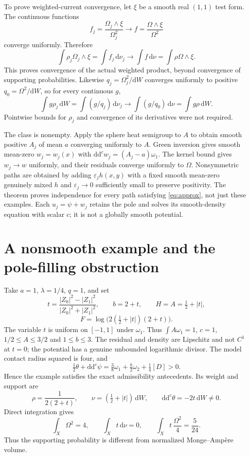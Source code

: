 \documentclass[11pt]{article}
\newcommand{\ddc}{\mathrm{d}\mathrm{d}^c}
\begin{document}
To prove weighted-current convergence, let $\xi$ be a smooth real
$(1,1)$ test form. The continuous functions
\[
 f_j=\frac{\Omega_j\wedge\xi}{\Omega_j^2}
 \longrightarrow f=\frac{\Omega\wedge\xi}{\Omega^2}
\]
converge uniformly. Therefore
\[
 \int\rho_j\Omega_j\wedge\xi
 =\int f_j\,\mathrm{d}\nu_j\longrightarrow
 \int f\,\mathrm{d}\nu=\int\rho\Omega\wedge\xi.
\]
This proves convergence of the actual weighted product, beyond convergence
of supporting probabilities. Likewise $q_j=\Omega_j^2/\mathrm{d}W$
converges uniformly to positive $q_0=\Omega^2/\mathrm{d}W$, so for every
continuous $g$,
\[
 \int g\rho_j\,\mathrm{d}W
 =\int(g/q_j)\,\mathrm{d}\nu_j\longrightarrow
 \int(g/q_0)\,\mathrm{d}\nu=\int g\rho\,\mathrm{d}W.
\]
Pointwise bounds for $\rho_j$ and convergence of its derivatives were
not required.

The class is nonempty. Apply the sphere heat semigroup to $A$ to obtain
smooth positive $A_j$ of mean $a$ converging uniformly to $A$.
Green inversion gives smooth mean-zero $w_j=w_j(x)$ with
$\ddc w_j=(A_j-a)\omega_1$. The kernel bound gives $w_j\to w$ uniformly,
and their residuals converge uniformly to $\Omega$.
Nonsymmetric paths are obtained by adding $\varepsilon_j h(x,y)$ with a
fixed smooth mean-zero genuinely mixed $h$ and $\varepsilon_j\to0$
sufficiently small to preserve positivity. The theorem proves independence
for every path satisfying \eqref{eq:approx}, not just these examples.
Each $u_j=\psi+w_j$ retains the pole and solves its smooth-density
equation with scalar $c$; it is not a globally smooth potential.

\section{A nonsmooth example and the pole-filling obstruction}

Take $a=1$, $\lambda=1/4$, $q=1$, and set
\[
 t=\frac{|Z_0|^2-|Z_1|^2}{|Z_0|^2+|Z_1|^2},
 \qquad b=2+t,\qquad H=A=\tfrac12+|t|,
\]
\[
 F=\log\bigl(2(\tfrac12+|t|)(2+t)\bigr).
\]
The variable $t$ is uniform on $[-1,1]$ under $\omega_1$. Thus
$\int A\omega_1=1$, $c=1$, $1/2\le A\le3/2$ and $1\le b\le3$.
The residual and density are Lipschitz and not $C^1$ at $t=0$;
the potential has a genuine unbounded logarithmic divisor.
The model contact radius squared is four, and
\[
 \tfrac12\theta+\ddc\psi
 =\tfrac38\omega_1+\tfrac b2\omega_2+\tfrac14[D]>0.
\]
Hence the example satisfies the exact admissibility antecedents. Its
weight and support are
\[
 \rho=\frac1{2(2+t)},\qquad\nu=(\tfrac12+|t|)\,\mathrm{d}W,
 \qquad\ddc\theta=-2t\,\mathrm{d}W\ne0.
\]
Direct integration gives
\[
 \int_X\Omega^2=4,\qquad
 \int_Xt\,\mathrm{d}\nu=0,\qquad
 \int_Xt\,\frac{\Omega^2}{4}=\frac5{24}.
\]
Thus the supporting probability is different from normalized
Monge--Amp\`ere volume.
\end{document}
